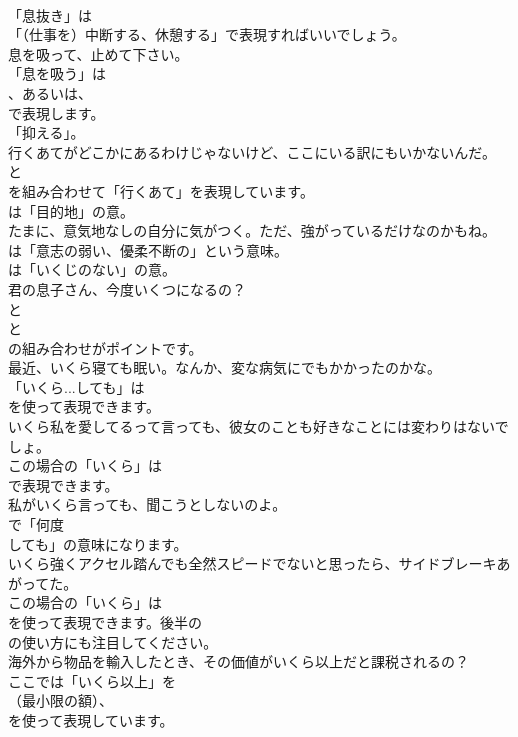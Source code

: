 \documentclass[8pt]{extreport}
\begin{document}
\begin{CJK}{UTF8}{min}
\\	「息抜き」は
\\	「（仕事を）中断する、休憩する」で表現すればいいでしょう。	
\\	息を吸って、止めて下さい。 
\\	「息を吸う」は
\\	、あるいは、
\\	で表現します。
\\	「抑える」。	
\\	行くあてがどこかにあるわけじゃないけど、ここにいる訳にもいかないんだ。 
\\	と 
\\	を組み合わせて「行くあて」を表現しています。
\\	は「目的地」の意。	
\\	たまに、意気地なしの自分に気がつく。ただ、強がっているだけなのかもね。 
\\	は「意志の弱い、優柔不断の」という意味。
\\	は「いくじのない」の意。	
\\	君の息子さん、今度いくつになるの？ 
\\	と
\\	と
\\	の組み合わせがポイントです。	
\\	最近、いくら寝ても眠い。なんか、変な病気にでもかかったのかな。 
\\	「いくら...しても」は
\\	を使って表現できます。	
\\	いくら私を愛してるって言っても、彼女のことも好きなことには変わりはないでしょ。 
\\	この場合の「いくら」は
\\	で表現できます。	
\\	私がいくら言っても、聞こうとしないのよ。 
\\	で「何度 
\\	しても」の意味になります。	
\\	いくら強くアクセル踏んでも全然スピードでないと思ったら、サイドブレーキあがってた。 
\\	この場合の「いくら」は
\\	を使って表現できます。後半の
\\	の使い方にも注目してください。	
\\	海外から物品を輸入したとき、その価値がいくら以上だと課税されるの？ 
\\	ここでは「いくら以上」を 
\\	（最小限の額）、
\\	を使って表現しています。	

\end{CJK}
\end{document}
